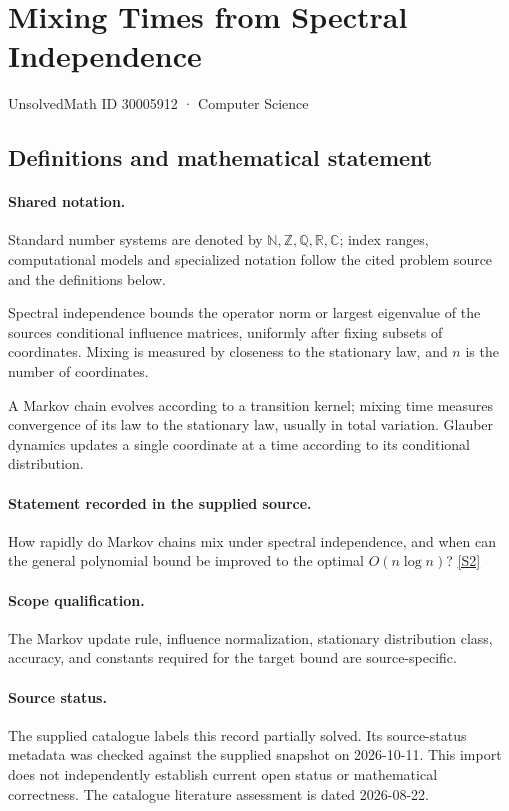 \documentclass[11pt]{article}
\newcommand{\sref}[2]{\hyperlink{source:#1:#2}{[S#2]}}
\begin{document}
\setcounter{section}{30005911}
\section{Mixing Times from Spectral Independence}\label{30005912}
{\small\sffamily UnsolvedMath ID 30005912 · Computer Science}
\subsection{Definitions and mathematical statement}

\paragraph{Shared notation.}Standard number systems are denoted by $\mathbb N,\mathbb Z,\mathbb Q,\mathbb R,\mathbb C$; index ranges, computational models and specialized notation follow the cited problem source and the definitions below.


Spectral independence bounds the operator norm or largest eigenvalue of the source\textquotesingle s conditional influence matrices, uniformly after fixing subsets of coordinates. Mixing is measured by closeness to the stationary law, and $n$ is the number of coordinates.

A Markov chain evolves according to a transition kernel; mixing time measures convergence of its law to the stationary law, usually in total variation. Glauber dynamics updates a single coordinate at a time according to its conditional distribution.
\paragraph{Statement recorded in the supplied source.}
How rapidly do Markov chains mix under spectral independence, and when can the general polynomial bound be improved to the optimal $O(n\log n)$? \sref{30005912}{2}
\paragraph{Scope qualification.}
The Markov update rule, influence normalization, stationary distribution class, accuracy, and constants required for the target bound are source-specific.
\paragraph{Source status.}
The supplied catalogue labels this record partially solved. Its source-status metadata was checked against the supplied snapshot on 2026-10-11. This import does not independently establish current open status or mathematical correctness. The catalogue literature assessment is dated 2026-08-22.
\end{document}
